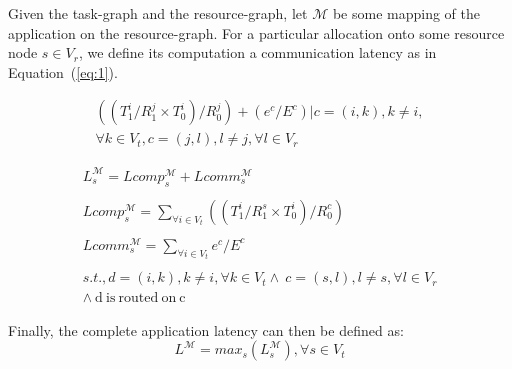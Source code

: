 \documentclass[10pt, conference, compsocconf]{IEEEtran}
\begin{document}
Given the task-graph and the resource-graph, let $\mathcal{M}$ be some
mapping of the application on the resource-graph. For a particular
allocation onto some resource node $s \in V_r$, we define its
computation a communication latency as in Equation~(\ref{eq:1}).


\begin{equation}
  \label{eq:3}
  \begin{array}{c}
    ((T^i_1/R^j_1\times T^i_0)/R^j_0)
    + (e^c/E^c) | c = (i,k), k \neq i, \\ \forall k \in V_t, c = (j,l), l
    \neq
    j, \forall l \in V_r
  \end{array}
\end{equation}

\begin{equation}
  \begin{array}{c}
    L^{\mathcal{M}}_s = Lcomp^{\mathcal{M}}_s +
    Lcomm^{\mathcal{M}}_s\\
	\\Lcomp^{\mathcal{M}}_s =
    \sum_{\forall i \in V_t} ((T^i_1/R^s_1\times T^i_0)/R^c_0)\\
    \\Lcomm^{\mathcal{M}}_s =
    \sum_{\forall i \in V_t} e^c / E^c\\
    \\s.t., d = (i,k), k \neq i, \forall k
    \in V_t \wedge\  c = (s,l), l \neq s, \forall l \in V_r \\
    \wedge\ \mathrm{d\ is\ routed\ on\ c}
  \end{array}
  \label{eq:1}
\end{equation}

Finally, the complete application latency can then be defined as:
\begin{equation}
  \label{eq:2}
  L^{\mathcal{M}} = max_{s}
  ({L^{\mathcal{M}}_s}), \forall s \in V_t
\end{equation}
\end{document}
